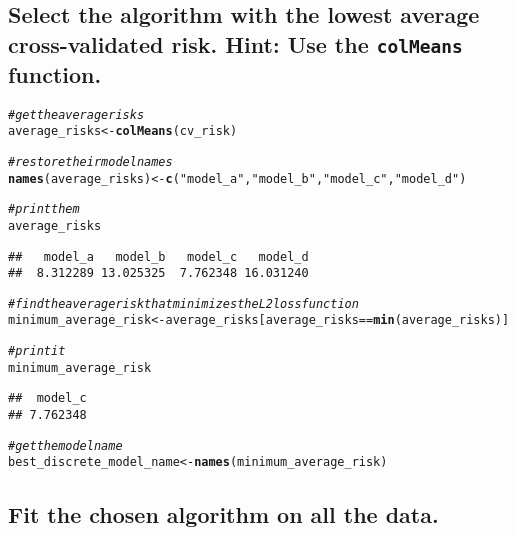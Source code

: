\documentclass{article}\usepackage[]{graphicx}\usepackage[]{xcolor}
\makeatletter
\newcommand{\hlstr}[1]{\textcolor[rgb]{0.192,0.494,0.8}{#1}}%
\newcommand{\hlcom}[1]{\textcolor[rgb]{0.678,0.584,0.686}{\textit{#1}}}%
\newcommand{\hlopt}[1]{\textcolor[rgb]{0,0,0}{#1}}%
\newcommand{\hlstd}[1]{\textcolor[rgb]{0.345,0.345,0.345}{#1}}%
\newcommand{\hlkwb}[1]{\textcolor[rgb]{0.69,0.353,0.396}{#1}}%
\newcommand{\hlkwd}[1]{\textcolor[rgb]{0.737,0.353,0.396}{\textbf{#1}}}%
\newenvironment{kframe}{%
 \def\at@end@of@kframe{}%
 \ifinner\ifhmode%
  \def\at@end@of@kframe{\end{minipage}}%
  \begin{minipage}{\columnwidth}%
 \fi\fi%
 \def\FrameCommand##1{\hskip\@totalleftmargin \hskip-\fboxsep
 \colorbox{shadecolor}{##1}\hskip-\fboxsep
     \hskip-\linewidth \hskip-\@totalleftmargin \hskip\columnwidth}%
 \MakeFramed {\advance\hsize-\width
   \@totalleftmargin\z@ \linewidth\hsize
   \@setminipage}}%
 {\par\unskip\endMakeFramed%
 \at@end@of@kframe}
\newenvironment{knitrout}{}{} %
\makeatother
\begin{document}
  \subsection{Select the algorithm with the lowest average cross-validated risk. Hint: Use the \texttt{colMeans} function.}
  
\begin{knitrout}
\color{fgcolor}\begin{kframe}
\begin{alltt}
\hlcom{# get the average risks}
\hlstd{average_risks} \hlkwb{<-} \hlkwd{colMeans}\hlstd{(cv_risk)}

\hlcom{# restore their model names}
\hlkwd{names}\hlstd{(average_risks)} \hlkwb{<-} \hlkwd{c}\hlstd{(}\hlstr{"model_a"}\hlstd{,} \hlstr{"model_b"}\hlstd{,} \hlstr{"model_c"}\hlstd{,} \hlstr{"model_d"}\hlstd{)}

\hlcom{# print them}
\hlstd{average_risks}
\end{alltt}
\begin{verbatim}
##   model_a   model_b   model_c   model_d 
##  8.312289 13.025325  7.762348 16.031240
\end{verbatim}
\begin{alltt}
\hlcom{# find the average risk that minimizes the L2 loss function}
\hlstd{minimum_average_risk} \hlkwb{<-} \hlstd{average_risks[average_risks} \hlopt{==} \hlkwd{min}\hlstd{(average_risks)]}

\hlcom{# print it}
\hlstd{minimum_average_risk}
\end{alltt}
\begin{verbatim}
##  model_c 
## 7.762348
\end{verbatim}
\begin{alltt}
\hlcom{# get the model name}
\hlstd{best_discrete_model_name} \hlkwb{<-} \hlkwd{names}\hlstd{(minimum_average_risk)}
\end{alltt}
\end{kframe}
\end{knitrout}


  \subsection{Fit the chosen algorithm on all the data.}
  
\end{document}
